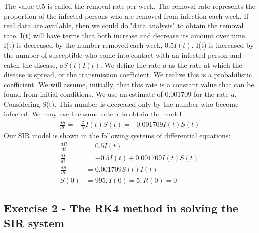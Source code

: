 \documentclass[a4paper]{article}
\begin{document}
        \indent The value 0.5 is called the removal rate per week. The removal rate represents the proportion of the infected persons who are removed from infection each week. If real data are available, then we could do "data analysis" to obtain the removal rate. I(t) will have terms that both increase and decrease its amount over time. I(t) is decreased by the number removed each week, $0.5I(t)$. I(t) is increased by the number of susceptible who come into contact with an infected person and catch the disease, $aS(t)I(t)$. We define the rate $a$ as the rate at which the disease is spread, or the transmission coefficient. We realize this is a probabilistic coefficient. We will assume, initially, that this rate is a constant value that can be found from initial conditions. We use an estimate of 0.001709 for the rate $a$. \\
        \indent Considering S(t). This number is decreased only by the number who become infected. We may use the same rate a to obtain the model.
        \begin{align*}
            \frac{dS}{dt} = - \frac{\beta}{N} I(t) S(t) = - 0.001709I(t) S(t)
        \end{align*}
        \indent Our SIR model is shown in the following systems of differential equations:
        \begin{align*}
            \frac{dR}{dt} & = 0.5 I(t) \\
            \frac{dI}{dt} & = -0.5 I(t) + 0.001709 I(t) S(t) \\
            \frac{dS}{dt} & = 0.001709 S(t) I(t) \\
            S(0) & = 995,I(0) = 5,R(0) = 0 
        \end{align*}
    \subsection{Exercise 2 - The RK4 method in solving the SIR system}
\end{document}

